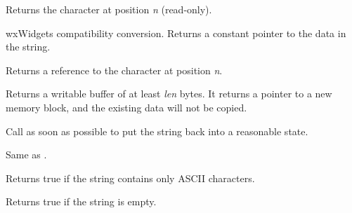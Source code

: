\label{wxstringgetchar}


Returns the character at position {\it n} (read-only).

\label{wxstringgetdata}


wxWidgets compatibility conversion. Returns a constant pointer to the data in the string.

\label{wxstringgetwritablechar}


Returns a reference to the character at position {\it n}.

\label{wxstringgetwritebuf}


Returns a writable buffer of at least {\it len} bytes.
It returns a pointer to a new memory block, and the
existing data will not be copied.

Call  as soon as possible
to put the string back into a reasonable state.

\label{wxstringindex}



Same as .

%
%
\label{wxstringisascii}


Returns true if the string contains only ASCII characters.

\label{wxstringisempty}


Returns true if the string is empty.

\label{wxstringisnull}

